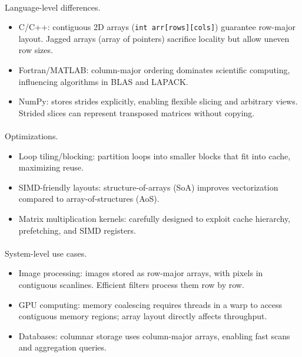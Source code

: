 \documentclass[
  letterpaper,
  DIV=11,
  numbers=noendperiod]{scrreprt}
\makeatletter
\let\oldparagraph\paragraph
\renewcommand{\paragraph}{
    \@ifstar
      \xxxParagraphStar
      \xxxParagraphNoStar
  }
\newcommand{\xxxParagraphStar}[1]{\oldparagraph*{#1}\mbox{}}
\newcommand{\xxxParagraphNoStar}[1]{\oldparagraph{#1}\mbox{}}
\providecommand{\tightlist}{%
  \setlength{\itemsep}{0pt}\setlength{\parskip}{0pt}}
\makeatother
\begin{document}
\paragraph{Language-level
differences.}\label{language-level-differences.}

\begin{itemize}
\tightlist
\item
  C/C++: contiguous 2D arrays (\texttt{int\ arr{[}rows{]}{[}cols{]}})
  guarantee row-major layout. Jagged arrays (array of pointers)
  sacrifice locality but allow uneven row sizes.
\item
  Fortran/MATLAB: column-major ordering dominates scientific computing,
  influencing algorithms in BLAS and LAPACK.
\item
  NumPy: stores strides explicitly, enabling flexible slicing and
  arbitrary views. Strided slices can represent transposed matrices
  without copying.
\end{itemize}

\paragraph{Optimizations.}\label{optimizations.}

\begin{itemize}
\tightlist
\item
  Loop tiling/blocking: partition loops into smaller blocks that fit
  into cache, maximizing reuse.
\item
  SIMD-friendly layouts: structure-of-arrays (SoA) improves
  vectorization compared to array-of-structures (AoS).
\item
  Matrix multiplication kernels: carefully designed to exploit cache
  hierarchy, prefetching, and SIMD registers.
\end{itemize}

\paragraph{System-level use cases.}\label{system-level-use-cases.}

\begin{itemize}
\tightlist
\item
  Image processing: images stored as row-major arrays, with pixels in
  contiguous scanlines. Efficient filters process them row by row.
\item
  GPU computing: memory coalescing requires threads in a warp to access
  contiguous memory regions; array layout directly affects throughput.
\item
  Databases: columnar storage uses column-major arrays, enabling fast
  scans and aggregation queries.
\end{itemize}
\end{document}
